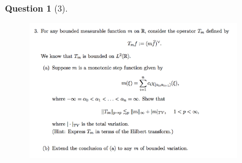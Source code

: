 \documentclass{article} %
\theoremstyle{quest}
\newtheorem*{question}{Question}
\begin{document}
\begin{question}[3]
\hfill
\begin{figure}[h!]
  \centering
    \includegraphics[width=0.8\textwidth]{HA-f-3.png}
\end{figure}
\end{question}
\end{document}
